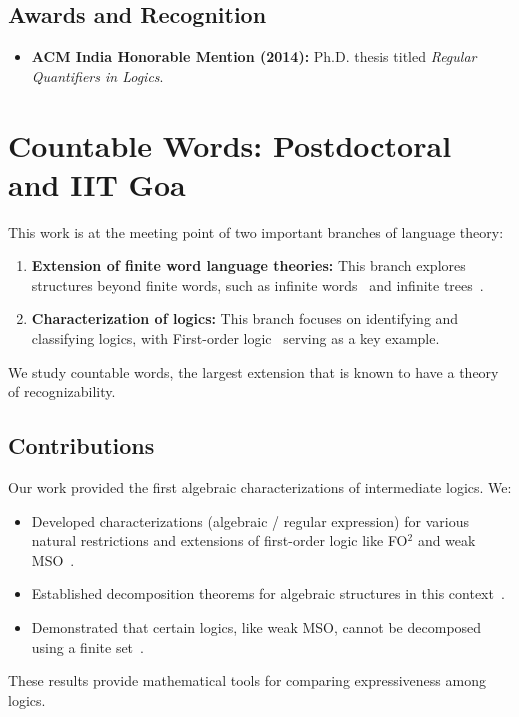 \documentclass[11pt,a4paper,sans]{moderncv} %
\begin{document}
\subsection{Awards and Recognition}
\begin{itemize}
    \item \textbf{ACM India Honorable Mention (2014):} Ph.D. thesis titled \emph{Regular Quantifiers in Logics}.
\end{itemize}

\section{Countable Words: Postdoctoral and IIT Goa}
This work is at the meeting point of two important branches of language theory:
\begin{enumerate}
 \item \textbf{Extension of finite word language theories:} This branch explores structures beyond finite words, such as infinite words~\cite{Buchi62} and infinite trees~\cite{Rabin69}.
 \item \textbf{Characterization of logics:} This branch focuses on identifying and classifying logics, with First-order logic~\cite{Schutzenberger65} serving as a key example.
\end{enumerate}

We study countable words, the largest extension that is known to have a theory of recognizability.

\subsection{Contributions}
Our work \cite{icalp15} provided the first algebraic characterizations of intermediate logics. We:
\begin{itemize}
    \item Developed characterizations (algebraic / regular expression) for various natural restrictions and extensions of first-order logic like \textsf{FO}$^2$ and weak \textsf{MSO}~\cite{icalp15,ms16}.
    \item Established decomposition theorems for algebraic structures in this context~\cite{lics19,jcss23}.
    \item Demonstrated that certain logics, like weak \textsf{MSO}, cannot be decomposed using a finite set~\cite{fct21}.
\end{itemize}
These results provide mathematical tools for comparing expressiveness among logics.
\end{document}
